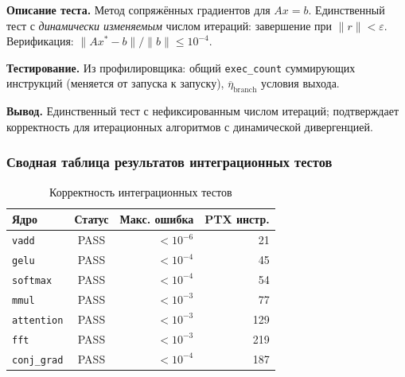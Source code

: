 \textbf{Описание теста.}
Метод сопряжённых градиентов для $Ax = b$. Единственный тест
с \textit{динамически изменяемым} числом итераций: завершение
при $\|r\| < \varepsilon$.
Верификация: $\|Ax^* - b\| / \|b\| \leq 10^{-4}$.

\textbf{Тестирование.}
Из профилировщика: общий \texttt{exec\_count} суммирующих инструкций
(меняется от запуска к запуску), $\overline{\eta}_{\mathrm{branch}}$
условия выхода.

\textbf{Вывод.}
Единственный тест с нефиксированным числом итераций; подтверждает
корректность для итерационных алгоритмов с динамической дивергенцией.

\subsubsection{Сводная таблица результатов интеграционных тестов}

\begin{table}[h]
  \caption{Корректность интеграционных тестов}
  \label{tab:integration_correctness}
  \centering
  \begin{tabular}{lcrr}
    \toprule
    \textbf{Ядро} & \textbf{Статус} & \textbf{Макс. ошибка} & \textbf{PTX инстр.} \\
    \midrule
    \texttt{vadd}       & PASS & $< 10^{-6}$ & 21 \\
    \texttt{gelu}       & PASS & $< 10^{-4}$ & 45 \\
    \texttt{softmax}    & PASS & $< 10^{-4}$ & 54 \\
    \texttt{mmul}       & PASS & $< 10^{-3}$ & 77 \\
    \texttt{attention}  & PASS & $< 10^{-3}$ & 129 \\
    \texttt{fft}        & PASS & $< 10^{-3}$ & 219 \\
    \texttt{conj\_grad} & PASS & $< 10^{-4}$ & 187 \\
    \bottomrule
  \end{tabular}
\end{table}

